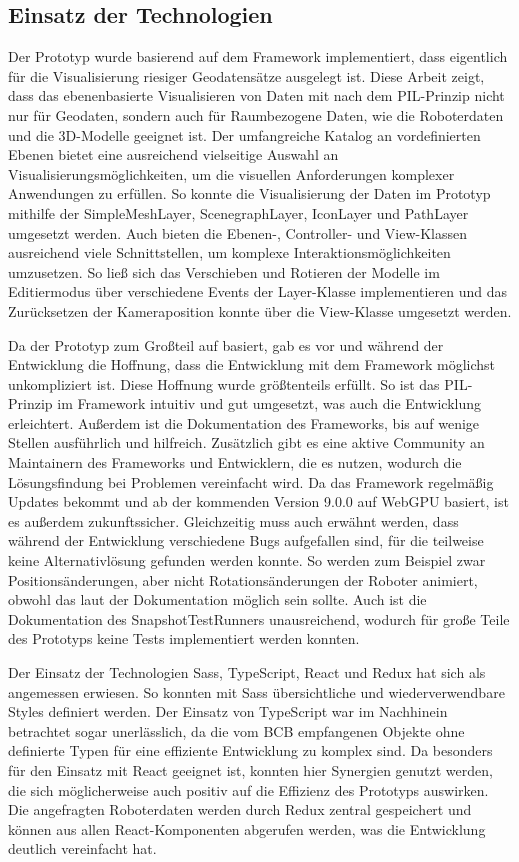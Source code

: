 \subsection{Einsatz der Technologien}
Der Prototyp wurde basierend auf dem Framework \deckgl{} implementiert, dass eigentlich für die Visualisierung riesiger Geodatensätze ausgelegt ist. Diese Arbeit zeigt, dass das ebenenbasierte Visualisieren von Daten mit \deckgl{} nach dem \ac{PIL}-Prinzip nicht nur für Geodaten, sondern auch für Raumbezogene Daten, wie die Roboterdaten und die 3D-Modelle geeignet ist. Der umfangreiche Katalog an vordefinierten Ebenen bietet eine ausreichend vielseitige Auswahl an Visualisierungsmöglichkeiten, um die visuellen Anforderungen komplexer Anwendungen zu erfüllen. So konnte die Visualisierung der Daten im Prototyp mithilfe der SimpleMeshLayer, ScenegraphLayer, IconLayer und PathLayer umgesetzt werden. Auch bieten die Ebenen-, Controller- und View-Klassen ausreichend viele Schnittstellen, um komplexe Interaktionsmöglichkeiten umzusetzen. So ließ sich das Verschieben und Rotieren der Modelle im Editiermodus über verschiedene Events der Layer-Klasse implementieren und das Zurücksetzen der Kameraposition konnte über die View-Klasse umgesetzt werden.

Da der Prototyp zum Großteil auf \deckgl{} basiert, gab es vor und während der Entwicklung die Hoffnung, dass die Entwicklung mit dem Framework möglichst unkompliziert ist. Diese Hoffnung wurde größtenteils erfüllt. So ist das \ac{PIL}-Prinzip im Framework intuitiv und gut umgesetzt, was auch die Entwicklung erleichtert. Außerdem ist die Dokumentation des Frameworks, bis auf wenige Stellen ausführlich und hilfreich. Zusätzlich gibt es eine aktive Community an Maintainern des Frameworks und Entwicklern, die es nutzen, wodurch die Lösungsfindung bei Problemen vereinfacht wird. Da das Framework regelmäßig Updates bekommt und ab der kommenden Version 9.0.0 auf WebGPU basiert, ist es außerdem zukunftssicher. Gleichzeitig muss auch erwähnt werden, dass während der Entwicklung verschiedene Bugs aufgefallen sind, für die teilweise keine Alternativlösung gefunden werden konnte. So werden zum Beispiel zwar Positionsänderungen, aber nicht Rotationsänderungen der Roboter animiert, obwohl das laut der Dokumentation möglich sein sollte. Auch ist die Dokumentation des SnapshotTestRunners unausreichend, wodurch für große Teile des Prototyps keine Tests implementiert werden konnten.

Der Einsatz der Technologien \ac{Sass}, TypeScript, React und Redux hat sich als angemessen erwiesen. So konnten mit \ac{Sass} übersichtliche und wiederverwendbare Styles definiert werden. Der Einsatz von TypeScript war im Nachhinein betrachtet sogar unerlässlich, da die vom \ac{BCB} empfangenen Objekte ohne definierte Typen für eine effiziente Entwicklung zu komplex sind. Da \deckgl{} besonders für den Einsatz mit React geeignet ist, konnten hier Synergien genutzt werden, die sich möglicherweise auch positiv auf die Effizienz des Prototyps auswirken. Die angefragten Roboterdaten werden durch Redux zentral gespeichert und können aus allen React-Komponenten abgerufen werden, was die Entwicklung deutlich vereinfacht hat.

